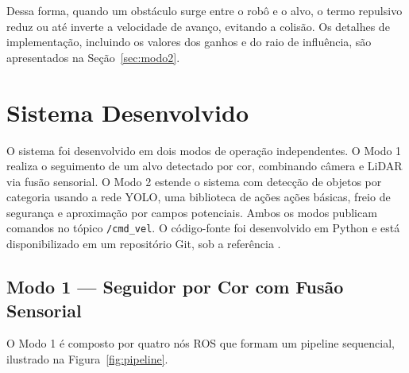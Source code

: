 Dessa forma, quando um obstáculo surge entre o robô e o alvo, o termo repulsivo
reduz ou até inverte a velocidade de avanço, evitando a colisão. Os detalhes de
implementação, incluindo os valores dos ganhos e do raio de influência, são
apresentados na Seção~\ref{sec:modo2}.


\newpage
\section{Sistema Desenvolvido}

O sistema foi desenvolvido em dois modos de operação independentes. O
Modo 1 realiza o seguimento de um alvo detectado por cor, combinando
câmera e LiDAR via fusão sensorial. O Modo 2 estende o sistema com
detecção de objetos por categoria usando a rede YOLO, uma biblioteca de ações
ações básicas, freio de segurança e aproximação por campos potenciais. Ambos os
modos publicam comandos no tópico \texttt{/cmd\_vel}. O código-fonte foi
desenvolvido em Python e está disponibilizado em um repositório Git, sob a
referência \cite{bonetti2024follower}.

\subsection{Modo 1 — Seguidor por Cor com Fusão Sensorial}
\label{sec:modo1}

O Modo 1 é composto por quatro nós ROS que formam um pipeline sequencial,
ilustrado na Figura~\ref{fig:pipeline}.


